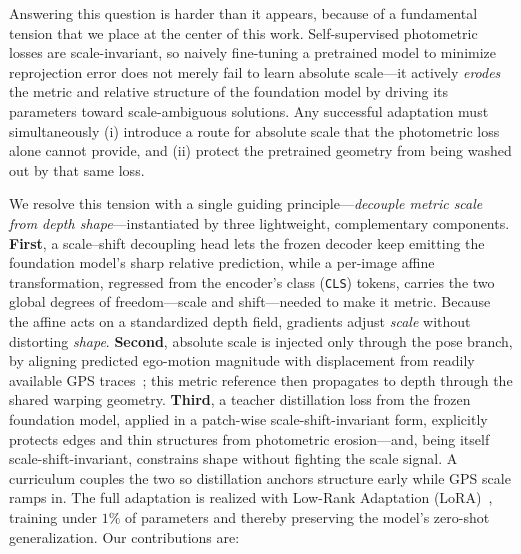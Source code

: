 \documentclass[journal]{IEEEtran}
\begin{document}
Answering this question is harder than it appears, because of a fundamental tension that we place at the center of this work. Self-supervised photometric losses are scale-invariant, so naively fine-tuning a pretrained model to minimize reprojection error does not merely fail to learn absolute scale---it actively \emph{erodes} the metric and relative structure of the foundation model by driving its parameters toward scale-ambiguous solutions. Any successful adaptation must simultaneously (i) introduce a route for absolute scale that the photometric loss alone cannot provide, and (ii) protect the pretrained geometry from being washed out by that same loss.

We resolve this tension with a single guiding principle---\emph{decouple metric scale from depth shape}---instantiated by three lightweight, complementary components. \textbf{First}, a scale--shift decoupling head lets the frozen decoder keep emitting the foundation model's sharp relative prediction, while a per-image affine transformation, regressed from the encoder's class (\texttt{CLS}) tokens, carries the two global degrees of freedom---scale and shift---needed to make it metric. Because the affine acts on a standardized depth field, gradients adjust \emph{scale} without distorting \emph{shape}. \textbf{Second}, absolute scale is injected only through the pose branch, by aligning predicted ego-motion magnitude with displacement from readily available GPS traces~\cite{chawla2021multimodal}; this metric reference then propagates to depth through the shared warping geometry. \textbf{Third}, a teacher distillation loss from the frozen foundation model, applied in a patch-wise scale-shift-invariant form, explicitly protects edges and thin structures from photometric erosion---and, being itself scale-shift-invariant, constrains shape without fighting the scale signal. A curriculum couples the two so distillation anchors structure early while GPS scale ramps in. The full adaptation is realized with Low-Rank Adaptation (LoRA)~\cite{hu2022lora}, training under $1\%$ of parameters and thereby preserving the model's zero-shot generalization. Our contributions are:
\end{document}
